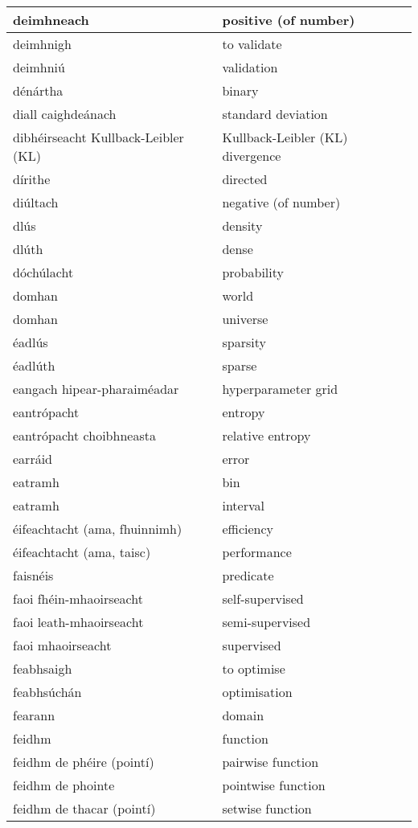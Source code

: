 \begin{longtable}{|l|l|}
		deimhneach&positive (of number)\\ \hline 
		deimhnigh&to validate\\ \hline 
		deimhniú&validation\\ \hline 
		dénártha&binary\\ \hline 
		diall caighdeánach&standard deviation\\ \hline 
		dibhéirseacht Kullback-Leibler (KL)&Kullback-Leibler (KL) divergence\\ \hline 
		dírithe&directed\\ \hline 
		diúltach&negative (of number)\\ \hline 
		dlús&density\\ \hline 
		dlúth&dense\\ \hline 
		dóchúlacht&probability\\ \hline 
		domhan&world\\ \hline 
		domhan&universe\\ \hline 
		éadlús&sparsity\\ \hline 
		éadlúth&sparse\\ \hline 
		eangach hipear-pharaiméadar&hyperparameter grid\\ \hline 
		eantrópacht&entropy\\ \hline 
		eantrópacht choibhneasta&relative entropy\\ \hline 
		earráid&error\\ \hline 
		eatramh&bin\\ \hline 
		eatramh&interval\\ \hline 
		éifeachtacht (ama, fhuinnimh)&efficiency\\ \hline 
		éifeachtacht (ama, taisc)&performance\\ \hline 
		faisnéis&predicate\\ \hline 
		faoi fhéin-mhaoirseacht&self-supervised\\ \hline 
		faoi leath-mhaoirseacht&semi-supervised\\ \hline 
		faoi mhaoirseacht&supervised\\ \hline 
		feabhsaigh&to optimise\\ \hline 
		feabhsúchán&optimisation\\ \hline 
		fearann&domain\\ \hline 
		feidhm&function\\ \hline 
		feidhm de phéire (pointí)&pairwise function\\ \hline 
		feidhm de phointe&pointwise function\\ \hline 
		feidhm de thacar (pointí)&setwise function\\ \hline 

\end{longtable}
